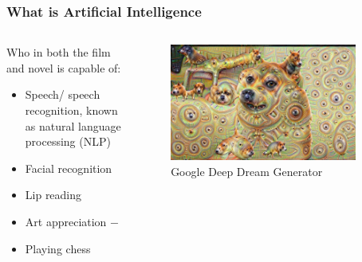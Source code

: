 \documentclass[aspectratio=169]{beamer}
\begin{document}
  \begin{frame}
    \frametitle{What is Artificial Intelligence}
    \begin{columns}
      \begin{column}{0.5\textwidth}
        Who in both the film and novel is capable of:
        \begin{itemize}
          \item Speech/ speech recognition, known as natural language processing (NLP)
          \item Facial recognition
          \item Lip reading
          \item Art appreciation $-$
          \item Playing chess
        \end{itemize}
      \end{column}
      \begin{column}{0.5\textwidth}
        \begin{figure}[th!]
          \centering
          \includegraphics[width=0.9\textwidth]{deep-dream.jpg}
          \caption{Google Deep Dream Generator}
          \label{fig:jim_carrey}
        \end{figure}
      \end{column}
    \end{columns}
  \end{frame}
\end{document}
